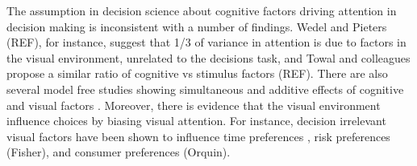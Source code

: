 \documentclass{article}
\begin{document}

The assumption in decision science about cognitive factors driving attention in decision making is inconsistent with a number of findings. Wedel and Pieters (REF), for instance, suggest that 1/3 of variance in attention is due to factors in the visual environment, unrelated to the decisions task, and Towal and colleagues propose a similar ratio of cognitive vs stimulus factors (REF). There are also several model free studies showing simultaneous and additive effects of cognitive and visual factors \cite{gidloef2017a,orquin2015a,peschel2019}. Moreover, there is evidence that the visual environment influence choices by biasing visual attention. For instance, decision irrelevant visual factors have been shown to influence time preferences \cite{reeck2017a}, risk preferences (Fisher), and consumer preferences (Orquin).
\end{document}
